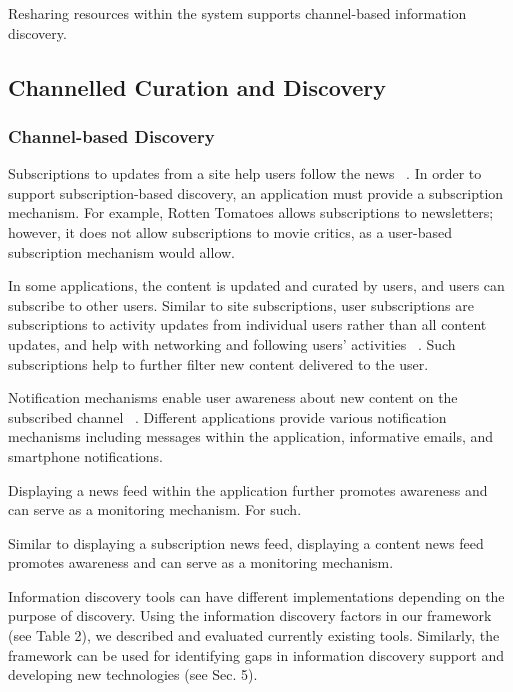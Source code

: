 {{{Resharing resources within the system supports channel-based information discovery. 
} %



} %


{\subsection{Channelled Curation and Discovery}

{\subsubsection{Channel-based Discovery}

Subscriptions to updates from a site help users follow the news ~\cite{java}. In order to support subscription-based discovery, an application must provide a subscription mechanism. For example, Rotten Tomatoes allows subscriptions to newsletters; however, it does not allow subscriptions to movie critics, as a user-based subscription mechanism would allow. 

In some applications, the content is updated and curated by users, and users can subscribe to other users. Similar to site subscriptions, user subscriptions are subscriptions to activity updates from individual users rather than all content updates, and help with networking and following users' activities ~\cite{millen}. Such subscriptions help to further filter new content delivered to the user. 

Notification mechanisms enable user awareness about new content on the subscribed channel ~\cite{millen}. Different applications provide various notification mechanisms including messages within the application, informative emails, and smartphone notifications.

Displaying a news feed within the application further promotes awareness and can serve as a monitoring mechanism. For such. 

Similar to displaying a subscription news feed, displaying a content news feed promotes awareness and can serve as a monitoring mechanism.

Information discovery tools can have different implementations depending on the purpose of discovery. Using the information discovery factors in our framework (see Table 2), we described and evaluated currently existing tools. Similarly, the framework can be used for identifying gaps in information discovery support and developing new technologies (see Sec. 5).   \\

}}}

